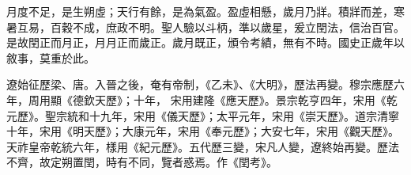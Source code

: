 
\begin{pinyinscope}

 月度不足，是生朔虛；天行有餘，是為氣盈。盈虛相懸，歲月乃牂。積牂而差，寒暑互易，百穀不成，庶政不明。聖人驗以斗柄，準以歲星，爰立閏法，信治百官。是故閏正而月正，月月正而歲正。歲月既正，頒令考績，無有不時。國史正歲年以敘事，莫重於此。



 遼始征歷梁、唐。入晉之後，奄有帝制，《乙未》、《大明》，歷法再變。穆宗應歷六
 年，周用顯《德欽天歷》；十年，
 宋用建隆《應天歷》。景宗乾亨四年，宋用《乾元歷》。聖宗統和十九年，宋用《儀天歷》；太平元年，宋用《崇天歷》。道宗清寧十年，宋用《明天歷》；大康元年，宋用《奉元歷》；大安七年，宋用《觀天歷》。天祚皇帝乾統六年，樣用《紀元歷》。五代歷三變，宋凡人變，遼終始再變。歷法不齊，故定朔置閏，時有不同，覽者惑焉。作《閏考》。



\end{pinyinscope}